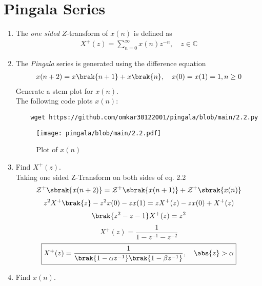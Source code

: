\documentclass[journal,12pt,twocolumn]{IEEEtran}
\renewcommand\thesection{\arabic{section}}
\begin{document}
\section{Pingala Series}
\begin{enumerate}[label=\thesection.\arabic*,ref=\thesection.\theenumi]
\item The {\em one sided} $Z$-transform of $x(n)$ is defined as 
\begin{align}
	X^{+}(z) = \sum_{n = 0}^{\infty}x(n)z^{-n}, \quad z \in \mathbb{C}
\label{eq:one-Z}
\end{align}
	\item The {\em Pingala} series is generated using the difference equation 
\begin{align}
	x(n+2) = x\brak{n+1} + x\brak{n},  \quad x(0) = x(1) = 1, n \ge 0
	\label{eq:10-pingala}
\end{align}
Generate a stem plot for $x(n)$. \\
\solution
The following code plots $x(n)$:
\begin{lstlisting}
	wget https://github.com/omkar30122001/pingala/blob/main/2.2.py
\end{lstlisting}
\begin{figure}[!htp]
	\texttt{[image: pingala/blob/main/2.2.pdf]}
	\caption{Plot of $x(n)$}
	\label{fig:xn}
\end{figure}
\item 		Find $X^{+}(z)$. \\
\solution
Taking one sided Z-Transform on both sides of eq. 2.2
\begin{equation}
	\mathcal{Z}^{+}\sbrak{x(n + 2)} = \mathcal{Z}^{+}\sbrak{x(n + 1)} + \mathcal{Z}^{+}\sbrak{x(n)}
\end{equation}
\begin{equation}
	{z}^{2}X^{+}\brak{z} - z^{2}x(0) - zx(1) = zX^{+}(z) - zx(0) + X^{+}(z)
\end{equation}
\begin{equation}
	\brak{z^{2} - z - 1}X^{+}(z) = z^{2}
\end{equation}
\begin{equation}
	X^{+}(z) = \frac{1}{1 - z^{-1} - z^{-2}}
\end{equation}
\begin{equation}
	\boxed{X^{+}(z) = \frac{1}{\brak{1 - \alpha{z^{-1}}}\brak{1 - \beta{z^{-1}}}} ,\quad \abs{z} > \alpha}
\end{equation}
\item Find $x(n)$. \\

\end{enumerate}
\end{document}
